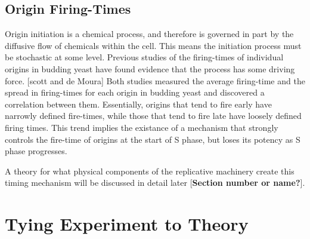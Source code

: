 \documentclass[serif]{sfuthesis}
\begin{document}
		\subsection{Origin Firing-Times}
		
		Origin initiation is a chemical process, and therefore is governed in part by the diffusive flow of chemicals within the cell.
		This means the initiation process must be stochastic at some level.
		Previous studies of the firing-times of individual origins in budding yeast have found evidence that the process has some driving force. [scott and de Moura]
		Both studies measured the average firing-time and the spread in firing-times for each origin in budding yeast and discovered a correlation between them.
		Essentially, origins that tend to fire early have narrowly defined fire-times, while those that tend to fire late have loosely defined firing times.
		This trend implies the existance of a mechanism that strongly controls the fire-time of origins at the start of S phase, but loses its potency as S phase progresses.
		
		A theory for what physical components of the replicative machinery create this timing mechanism will be discussed in detail later [\textbf{Section number or name?}].
		
		
	\section{Tying Experiment to Theory}
	
	


			
\end{document}
